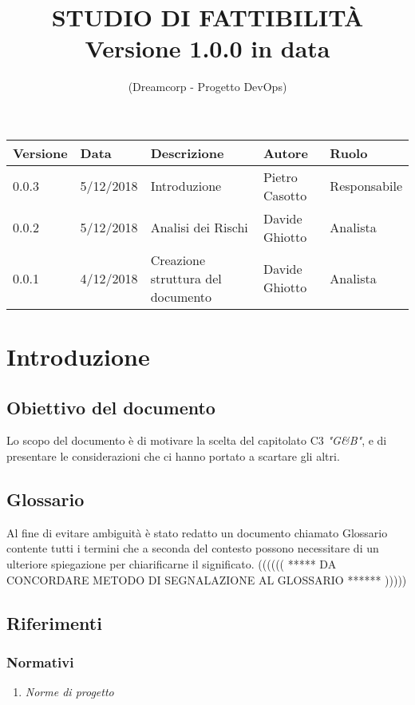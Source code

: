 \documentclass{article}
\title{\textbf{STUDIO DI FATTIBILITÀ}
\\{\Large Versione 1.0.0 in data }}
\author{(Dreamcorp - Progetto DevOps)}
\begin{document}
\maketitle



\begin{tabularx}{\textwidth}{|X|X|X|X|X|}
    \hline
    \textbf{Versione} & \textbf{Data} & \textbf{Descrizione} & \textbf{Autore} & \textbf{Ruolo}\\
    \hline
    0.0.3 & 5/12/2018 & Introduzione & Pietro Casotto & Responsabile \\
    \hline
    0.0.2 & 5/12/2018 & Analisi dei Rischi & Davide Ghiotto & Analista \\
    \hline
    0.0.1 & 4/12/2018 & Creazione struttura del documento & Davide Ghiotto & Analista  \\
    \hline
\end{tabularx}
\newpage

\section{Introduzione}
    \subsection{Obiettivo del documento}
    Lo scopo del documento è di motivare la scelta del capitolato C3 \textit{"G\&B"}, e di presentare le    considerazioni che ci hanno portato a scartare gli altri.
    \subsection{Glossario}
        Al fine di evitare ambiguità è stato redatto un documento chiamato Glossario contente tutti i termini che a seconda del contesto possono necessitare di un ulteriore spiegazione per chiarificarne il   significato. ((((((  *****   DA CONCORDARE METODO DI SEGNALAZIONE AL GLOSSARIO ******   ))))) 
    \subsection{Riferimenti}
        \subsubsection{Normativi}
            \begin{enumerate}
                \item \textit{Norme di progetto}
            \end{enumerate}
\end{document}
